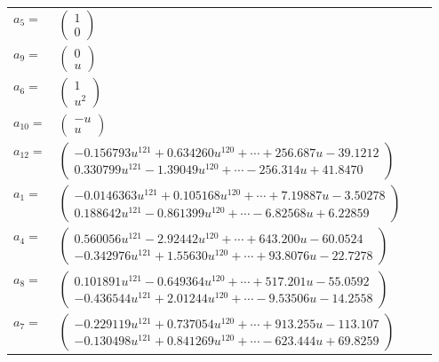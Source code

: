 \documentclass[1p]{elsarticle_modified}
\theoremstyle{definition}
\begin{document}
\begin{tabular}{m{7pt} m{180pt} m{7pt} m{180pt} }
\flushright $a_{5}=$&$\begin{pmatrix}1\\0\end{pmatrix}$ \\
\flushright $a_{9}=$&$\begin{pmatrix}0\\u\end{pmatrix}$ \\
\flushright $a_{6}=$&$\begin{pmatrix}1\\u^2\end{pmatrix}$ \\
\flushright $a_{10}=$&$\begin{pmatrix}- u\\u\end{pmatrix}$ \\
\flushright $a_{12}=$&$\begin{pmatrix}-0.156793 u^{121}+0.634260 u^{120}+\cdots+256.687 u-39.1212\\0.330799 u^{121}-1.39049 u^{120}+\cdots-256.314 u+41.8470\end{pmatrix}$ \\
\flushright $a_{1}=$&$\begin{pmatrix}-0.0146363 u^{121}+0.105168 u^{120}+\cdots+7.19887 u-3.50278\\0.188642 u^{121}-0.861399 u^{120}+\cdots-6.82568 u+6.22859\end{pmatrix}$ \\
\flushright $a_{4}=$&$\begin{pmatrix}0.560056 u^{121}-2.92442 u^{120}+\cdots+643.200 u-60.0524\\-0.342976 u^{121}+1.55630 u^{120}+\cdots+93.8076 u-22.7278\end{pmatrix}$ \\
\flushright $a_{8}=$&$\begin{pmatrix}0.101891 u^{121}-0.649364 u^{120}+\cdots+517.201 u-55.0592\\-0.436544 u^{121}+2.01244 u^{120}+\cdots-9.53506 u-14.2558\end{pmatrix}$ \\
\flushright $a_{7}=$&$\begin{pmatrix}-0.229119 u^{121}+0.737054 u^{120}+\cdots+913.255 u-113.107\\-0.130498 u^{121}+0.841269 u^{120}+\cdots-623.444 u+69.8259\end{pmatrix}$ \\

\end{tabular}
\end{document}

